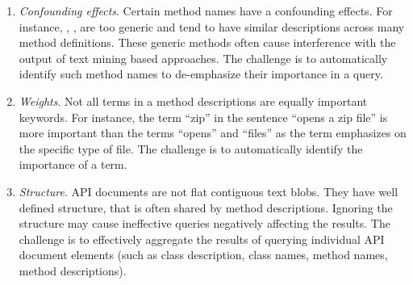 \begin{enumerate}
		
	\item \textit{Confounding effects}. Certain method names have a confounding effects. For instance, , ,  are too generic and tend to have similar descriptions across many method definitions. These generic methods often cause interference with the output of text mining based approaches. The challenge is to automatically identify such method names to de-emphasize their importance in a query. 
	
	\item \textit{Weights}. Not all terms in a method descriptions are equally important keywords. For instance, the term ``zip'' in the sentence ``opens a zip file'' is more important than the terms ``opens'' and ``files'' as the term emphasizes on the specific type of file. The challenge is to automatically identify the importance of a term.
	
	\item \textit{Structure}. API documents are not flat contiguous text blobs. They have well defined structure, that is often shared by method descriptions. Ignoring the structure may cause ineffective queries negatively affecting the results. The challenge is to effectively aggregate the results of querying individual API document elements (such as class description, class names, method names, method descriptions).
			
	
\end{enumerate}
